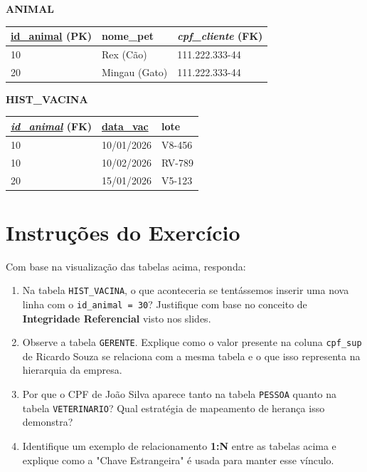 \documentclass[12pt]{article}
\begin{document}
\begin{table}[H]
    \vspace{0.5cm}

    \textbf{ANIMAL}\\
    \begin{tabular}{|l|l|l|}
    \hline
    \rowcolor{tableheader} \underline{id\_animal} (PK) & nome\_pet & \textit{cpf\_cliente} (FK) \\ \hline
    10 & Rex (Cão) & 111.222.333-44 \\ \hline
    20 & Mingau (Gato) & 111.222.333-44 \\ \hline
    \end{tabular}

    \vspace{0.5cm}

    \textbf{HIST\_VACINA}\\
    \begin{tabular}{|l|l|l|}
    \hline
    \rowcolor{tableheader} \underline{\textit{id\_animal}} (FK) & \underline{data\_vac} & lote \\ \hline
    10 & 10/01/2026 & V8-456 \\ \hline
    10 & 10/02/2026 & RV-789 \\ \hline
    20 & 15/01/2026 & V5-123 \\ \hline
    \end{tabular}
\end{table}



\section*{Instruções do Exercício}

Com base na visualização das tabelas acima, responda:

\begin{enumerate}[label=\alph*)]
    \item Na tabela \texttt{HIST\_VACINA}, o que aconteceria se tentássemos inserir uma nova linha com o \texttt{id\_animal = 30}? Justifique com base no conceito de \textbf{Integridade Referencial} visto nos slides.
    \item Observe a tabela \texttt{GERENTE}. Explique como o valor presente na coluna \texttt{cpf\_sup} de Ricardo Souza se relaciona com a mesma tabela e o que isso representa na hierarquia da empresa.
    \item Por que o CPF de João Silva aparece tanto na tabela \texttt{PESSOA} quanto na tabela \texttt{VETERINARIO}? Qual estratégia de mapeamento de herança isso demonstra?
    \item Identifique um exemplo de relacionamento \textbf{1:N} entre as tabelas acima e explique como a "Chave Estrangeira" é usada para manter esse vínculo.
\end{enumerate}
\end{document}

